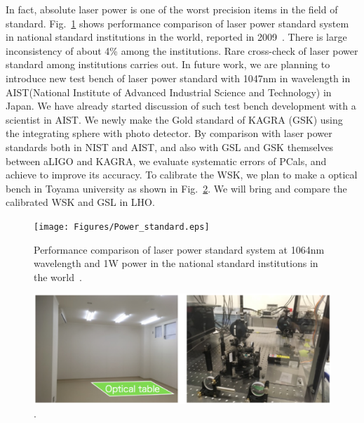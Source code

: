 In fact, absolute laser power is one of the worst precision items in the field of standard. Fig.~\ref{fig:Power_standard} shows performance comparison of laser power standard system in national standard institutions in the world, reported in 2009~\cite{EUROMET}. There is large inconsistency of about 4\% among the institutions. Rare cross-check of laser power standard among institutions carries out. In future work, we are planning to introduce new test bench of laser power standard with 1047nm in wavelength in AIST(National Institute of Advanced Industrial Science and Technology)  in Japan. We have already started discussion of such test bench development with a scientist in AIST. We newly make the Gold standard of KAGRA (GSK) using the integrating sphere with photo detector. By comparison with laser power standards both in NIST and AIST, and also with GSL and GSK themselves between aLIGO and KAGRA, we evaluate systematic errors of PCals, and achieve to improve its accuracy. To calibrate the WSK, we plan to make a optical bench in Toyama university as shown in Fig.~\ref{fig:Toyama}. We will bring and compare the calibrated WSK and GSL in LHO.

\begin{figure}
\begin{center}
\texttt{[image: Figures/Power\_standard.eps]}
\caption{
Performance comparison of laser power standard system at 1064nm wavelength and 1W power in the national standard institutions in the world~\cite{EUROMET}.
} 
\label{fig:Power_standard} 
\end{center}
\end{figure}

\begin{figure}
\begin{center}
\includegraphics[width=14cm]{Figures/Toyama.eps}
\caption{.} 
\label{fig:Toyama} 
\end{center}
\end{figure}
